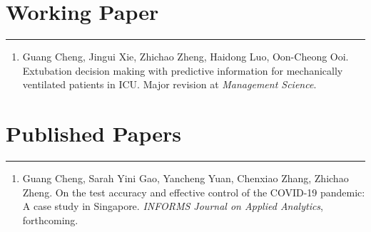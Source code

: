 \documentclass[12pt, a4paper]{article}
\begin{document}
{\begin{itemize}[leftmargin=36pt, itemsep=6pt, parsep=0.2pt, topsep=1pt]

\end{itemize}




\section*{Working Paper}
\vspace*{0.4em}
\hrule height 0.5pt
\begin{enumerate}[leftmargin=36pt, itemsep=6pt, parsep=0.2pt, topsep=1pt]

	\item Guang Cheng, Jingui Xie, Zhichao Zheng, Haidong Luo, Oon-Cheong Ooi.
	Extubation decision making with predictive information for mechanically ventilated patients in ICU.
	Major revision at {\it Management Science}.


\end{enumerate}




\section*{Published Papers}
\vspace*{0.4em}
\hrule height 0.5pt
\begin{enumerate}[leftmargin=36pt, itemsep=6pt, parsep=0.2pt, topsep=1pt]

	\item Guang Cheng, Sarah Yini Gao, Yancheng Yuan, Chenxiao Zhang, Zhichao Zheng. 
	On the test accuracy and effective control of the COVID-19 pandemic: A case study in Singapore. 
	{\it INFORMS Journal on Applied Analytics}, forthcoming.


\end{enumerate}}
\end{document}
